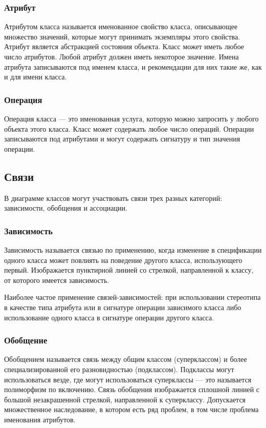 \documentclass[a4paper,12pt]{article}
\begin{document}
\subsubsection{Атрибут}

Атрибутом класса называется именованное свойство класса, описывающее множество значений, которые могут принимать экземпляры этого свойства. Атрибут является абстракцией состояния объекта. Класс может иметь любое число атрибутов. Любой атрибут должен иметь некоторое значение. Имена атрибута записываются под именем класса, и рекомендации для них такие же, как и для имени класса.

\subsubsection{Операция}

Операция класса — это именованная услуга, которую можно запросить у любого объекта этого класса. Класс может содержать любое число операций. Операции записываются под атрибутами и могут содержать сигнатуру и тип значения операции.

\subsection{Связи}

В диаграмме классов могут участвовать связи трех разных категорий: зависимости, обобщения и ассоциации.

\subsubsection{Зависимость}

Зависимость называется связью по применению, когда изменение в спецификации одного класса может повлиять на поведение другого класса, использующего первый. Изображается пунктирной линией со стрелкой, направленной к классу, от которого имеется зависимость.

Наиболее частое применение связей-зависимостей: при использовании стереотипа в качестве типа атрибута или в сигнатуре операции зависимого класса либо использование одного класса в сигнатуре операции другого класса.

\subsubsection{Обобщение}

Обобщением называется связь между общим классом (суперклассом) и более специализированной его разновидностью (подклассом). Подклассы могут использоваться везде, где могут использоваться суперклассы — это называется полиморфизм по включению. Связь обобщения изображается сплошной линией с большой незакрашенной стрелкой, направленной к суперклассу. Допускается множественное наследование, в котором есть ряд проблем, в том числе проблема именования атрибутов.
\end{document}
